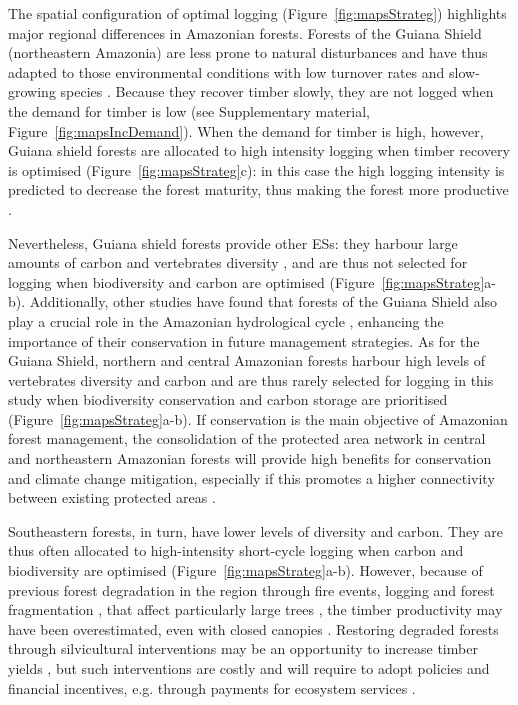 \documentclass{article}
\begin{document}
The spatial configuration of optimal logging (Figure~\ref{fig:mapsStrateg}) highlights major regional differences in Amazonian forests. Forests of the Guiana Shield (northeastern Amazonia) are less prone to natural disturbances \cite{Espirito-Santo2014} and have thus adapted to those environmental conditions with low turnover rates and slow-growing species \cite{Johnson2016,Quesada2012}. 
Because they recover timber slowly, they are not logged when the demand for timber is low (see Supplementary material, Figure~\ref{fig:mapsIncDemand}). 
When the demand for timber is high, however, Guiana shield forests are allocated to high intensity logging when timber recovery is optimised (Figure~\ref{fig:mapsStrateg}c): in this case the high logging intensity is predicted to decrease the forest maturity, thus making the forest more productive \cite{Piponiot2018,Roedig2018,Perez-Espana1999}.

Nevertheless, Guiana shield forests provide other ESs: they harbour large amounts of carbon \cite{Avitabile2016} and vertebrates diversity \cite{Jenkins2013}, and are thus not selected for logging when biodiversity and carbon are optimised (Figure~\ref{fig:mapsStrateg}a-b). 
Additionally, other studies have found that forests of the Guiana Shield also play a crucial role in the Amazonian hydrological cycle \cite{Staal2018,Bovolo2018}, enhancing the importance of their conservation in future management strategies. 
As for the Guiana Shield, northern and central Amazonian forests harbour high levels of vertebrates diversity \cite{Jenkins2013} and carbon \cite{Avitabile2016} and are thus rarely selected for logging in this study when biodiversity conservation and carbon storage are prioritised (Figure~\ref{fig:mapsStrateg}a-b). If conservation is the main objective of Amazonian forest management, the consolidation of the protected area network in central and northeastern Amazonian forests will provide high benefits for conservation and climate change mitigation, especially if this promotes a higher connectivity between existing protected areas \cite{Hansen2007}. 

Southeastern forests, in turn, have lower levels of diversity and carbon. They are thus often allocated to high-intensity short-cycle logging when carbon and biodiversity are optimised (Figure~\ref{fig:mapsStrateg}a-b). 
However, because of previous forest degradation in the region through fire events, logging and forest fragmentation \cite{Foley2007,Davidson2012}, that affect particularly large trees \cite{Laurance2000,Gerwing2002}, the timber productivity may have been overestimated, even with closed canopies \cite{Asner2004}. Restoring degraded forests through silvicultural interventions may be an opportunity to increase timber yields \cite{Lamb2005}, but such interventions are costly and will require to adopt policies and financial incentives, e.g. through payments for ecosystem services \cite{Salzman2018}.
\end{document}
